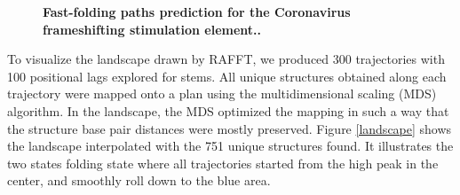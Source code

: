 \documentclass[a4paper,12pt]{article}
\begin{document}
{{\begin{figure}[!h]
  \caption{\textbf{Fast-folding paths prediction for the Coronavirus frameshifting stimulation element.\label{folding_dynamics}.}}
\end{figure}

To visualize the landscape drawn by RAFFT, we produced 300 trajectories with 100
positional lags explored for stems. All unique structures obtained along each
trajectory were mapped onto a plan using the multidimensional scaling (MDS)
algorithm. In the landscape, the MDS optimized the mapping in such a way that
the structure base pair distances were mostly preserved. Figure \ref{landscape}
shows the landscape interpolated with the 751 unique structures found. It
illustrates the two states folding state where all trajectories started from the
high peak in the center, and smoothly roll down to the blue area.


}}
\end{document}
